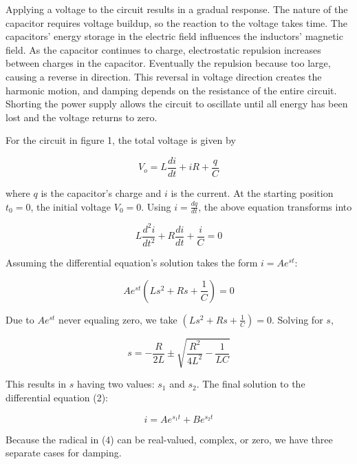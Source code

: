 \documentclass[twocolumn, letterpaper, 10pt, twoside]{article}
\begin{document}
 Applying a voltage to the circuit results in a gradual response. The nature of the capacitor requires voltage buildup, so the reaction to the voltage takes time. The capacitors' energy storage in the electric field influences the inductors' magnetic field. As the capacitor continues to charge, electrostatic repulsion increases between charges in the capacitor. Eventually the repulsion because too large, causing a reverse in direction. This reversal in voltage direction creates the harmonic motion, and damping depends on the resistance of the entire circuit. Shorting the power supply allows the circuit to oscillate until all energy has been lost and the voltage returns to zero.
 
 
 For the circuit in figure 1, the total voltage is given by
 
  \begin{equation}
 V_o = L\frac{di}{dt} + iR + \frac{q}{C}
 \end{equation}
 
 where $q$ is the capacitor's charge and $i$ is the current. At the starting position $t_0 = 0$, the initial voltage $V_0 = 0$. Using $i = \frac{dq}{dt}$, the above equation transforms into 
 
 
 \begin{equation}
L\frac{d^2i}{dt^2} + R\frac{di}{dt} + \frac{i}{C} = 0
 \end{equation}  
 
 
 Assuming the differential equation's solution takes the form $i = Ae^{st}$:
 
   \begin{equation}
Ae^{st}(Ls^2 + Rs + \frac{1}{C}) = 0 
 \end{equation}
 
 Due to $Ae^{st}$ never equaling zero, we take $(Ls^2 + Rs + \frac{1}{C}) = 0 $. Solving for $s$,
 
  \begin{equation}
s = -\frac{R}{2L} \pm \sqrt{\frac{R^2}{4L^2} - \frac{1}{LC}}
 \end{equation}
 
 This results in $s$ having two values: $s_1$ and $s_2$. The final solution to the differential equation (2):
 
   \begin{equation}
i = Ae^{s_1t} + Be^{s_2t}
 \end{equation}
 
 Because the radical in (4) can be real-valued, complex, or zero, we have three separate cases for damping. 
 
\end{document}

